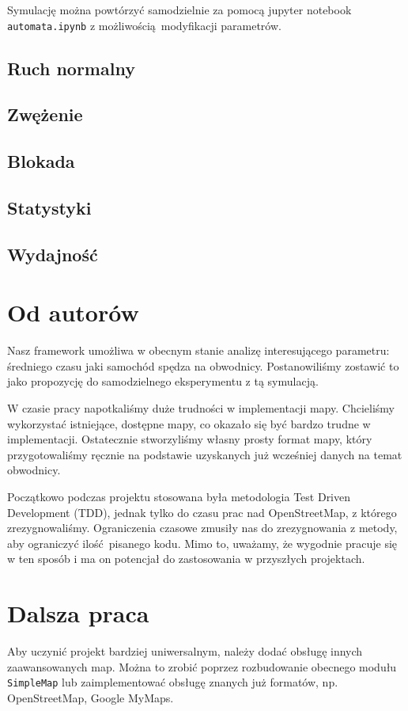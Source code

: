\documentclass[a4paper,12pt]{article}
\begin{document}
    Symulację można powtórzyć samodzielnie za pomocą jupyter notebook \texttt{automata.ipynb} z możliwością modyfikacji parametrów.
    
    \subsection{Ruch normalny}
    \subsection{Zwężenie}
    \subsection{Blokada}
    \subsection{Statystyki}
    \subsection{Wydajność}
		
    \section{Od autorów}
    Nasz framework umożliwa w obecnym stanie analizę interesującego parametru: średniego czasu jaki samochód spędza na obwodnicy. Postanowiliśmy zostawić to jako propozycję do samodzielnego eksperymentu z tą symulacją.
    
    W czasie pracy napotkaliśmy duże trudności w implementacji mapy. Chcieliśmy wykorzystać istniejące, dostępne mapy, co okazało się być bardzo trudne w implementacji. Ostatecznie stworzyliśmy własny prosty format mapy, który przygotowaliśmy ręcznie na podstawie uzyskanych już wcześniej danych na temat obwodnicy.
    
    Początkowo podczas projektu stosowana była metodologia Test Driven Development (TDD), jednak tylko do czasu prac nad OpenStreetMap, z którego zrezygnowaliśmy. Ograniczenia czasowe zmusiły nas do zrezygnowania z metody, aby ograniczyć ilość pisanego kodu. Mimo to, uważamy, że wygodnie pracuje się w ten sposób i ma on potencjał do zastosowania w przyszłych projektach.

    \section{Dalsza praca}
    Aby uczynić projekt bardziej uniwersalnym, należy dodać obsługę innych zaawansowanych map.
    Można to zrobić poprzez rozbudowanie obecnego modułu \texttt{SimpleMap} lub zaimplementować obsługę znanych już formatów, np. OpenStreetMap, Google MyMaps.
    
\end{document}
